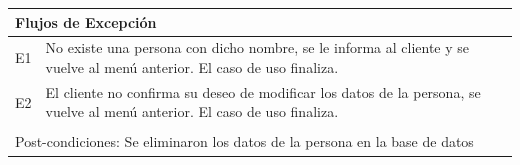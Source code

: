 \documentclass[11pt]{article}
\begin{document}
\begin{tabular}{|l|m{}|}
    \multicolumn{2}{|l|}{Flujos de Excepción} \\
    \hline
  
    E1 & No existe una persona con dicho nombre, se le informa al cliente y se vuelve al men\'u anterior. 
    El caso de uso finaliza.\\
    E2 & El cliente no confirma su deseo de modificar los datos de la persona, se vuelve al men\'u anterior. 
    El caso de uso finaliza.\\
    
    \hline
    \multicolumn{2}{|l|}{\rowcolor[gray]{.5}} \\
    \hline
  
   \multicolumn{2}{|m{0.9\textwidth}|}{Post-condiciones: Se eliminaron los datos de la persona en la base de datos} \\
  
    \hline
  \end{tabular}
  \newline
\end{document}
